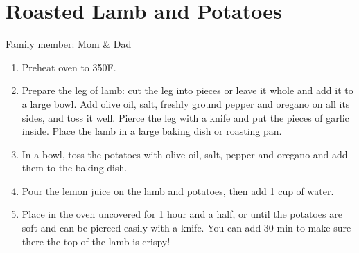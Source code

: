\chapter{Roasted Lamb and Potatoes}
\label{ch:lambpotatoes}


Family member: Mom \& Dad

\begin{enumerate}
    \item Preheat oven to 350\degree F.
    \item Prepare the leg of lamb: cut the leg into pieces or leave it whole and add it to a large bowl.  Add olive oil, salt, freshly ground pepper and oregano on all its sides, and toss it well. Pierce the leg with a knife and put the pieces of garlic inside. Place the lamb in a large baking dish or roasting pan.
    \item In a bowl, toss the potatoes with olive oil, salt, pepper and oregano and add them to the baking dish.
    \item Pour the lemon juice on the lamb and potatoes, then add 1 cup of water.
    \item Place in the oven uncovered for 1 hour and a half, or until the potatoes are soft and can be pierced easily with a knife. You can add 30 min to make sure there the top of the lamb is crispy!
\end{enumerate}

